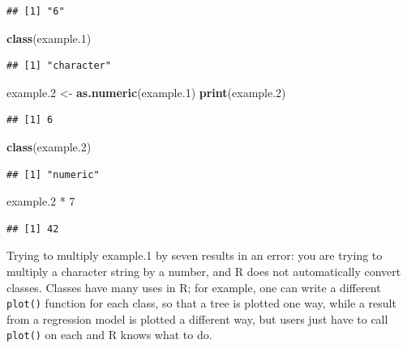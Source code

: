 \documentclass[]{book}
\newenvironment{Shaded}{\begin{snugshade}}{\end{snugshade}}
\newcommand{\KeywordTok}[1]{\textcolor[rgb]{0.13,0.29,0.53}{\textbf{{#1}}}}
\newcommand{\DecValTok}[1]{\textcolor[rgb]{0.00,0.00,0.81}{{#1}}}
\newcommand{\FloatTok}[1]{\textcolor[rgb]{0.00,0.00,0.81}{{#1}}}
\newcommand{\StringTok}[1]{\textcolor[rgb]{0.31,0.60,0.02}{{#1}}}
\newcommand{\NormalTok}[1]{{#1}}
\theoremstyle{definition}
\theoremstyle{definition}
\theoremstyle{remark}
\begin{document}
\begin{verbatim}
## [1] "6"
\end{verbatim}

\begin{Shaded}
\begin{Highlighting}[]
\KeywordTok{class}\NormalTok{(example}\FloatTok{.1}\NormalTok{)}
\end{Highlighting}
\end{Shaded}

\begin{verbatim}
## [1] "character"
\end{verbatim}

\begin{Shaded}
\begin{Highlighting}[]
\NormalTok{example}\FloatTok{.2} \NormalTok{<-}\StringTok{ }\KeywordTok{as.numeric}\NormalTok{(example}\FloatTok{.1}\NormalTok{)}
\KeywordTok{print}\NormalTok{(example}\FloatTok{.2}\NormalTok{)}
\end{Highlighting}
\end{Shaded}

\begin{verbatim}
## [1] 6
\end{verbatim}

\begin{Shaded}
\begin{Highlighting}[]
\KeywordTok{class}\NormalTok{(example}\FloatTok{.2}\NormalTok{)}
\end{Highlighting}
\end{Shaded}

\begin{verbatim}
## [1] "numeric"
\end{verbatim}

\begin{Shaded}
\begin{Highlighting}[]
\NormalTok{example}\FloatTok{.2} \NormalTok{*}\StringTok{ }\DecValTok{7}
\end{Highlighting}
\end{Shaded}

\begin{verbatim}
## [1] 42
\end{verbatim}

Trying to multiply example.1 by seven results in an error: you are
trying to multiply a character string by a number, and R does not
automatically convert classes. Classes have many uses in R; for example,
one can write a different \texttt{plot()} function for each class, so
that a tree is plotted one way, while a result from a regression model
is plotted a different way, but users just have to call \texttt{plot()}
on each and R knows what to do.
\end{document}
